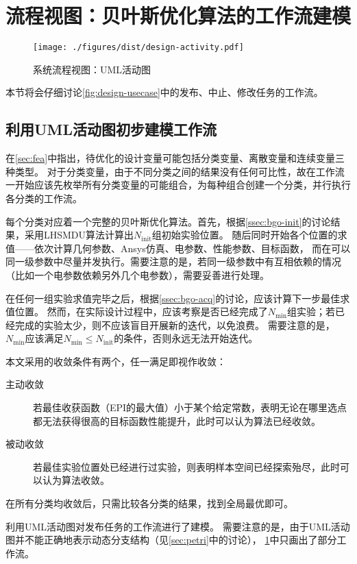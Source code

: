 \documentclass[index]{subfiles}
\begin{document}
\section{流程视图：贝叶斯优化算法的工作流建模}\label{sec:design-wf}
\begin{figure}[h]
  \centering
  \texttt{[image: ./figures/dist/design-activity.pdf]}
  \caption{系统流程视图：UML活动图\label{fig:design-activity}}
\end{figure}
本节将会仔细讨论\cref{fig:design-usecase}中的发布、中止、修改任务的工作流。

\subsection{利用UML活动图初步建模工作流}
在\cref{sec:fea}中指出，待优化的设计变量可能包括分类变量、离散变量和连续变量三种类型。
对于分类变量，由于不同分类之间的结果没有任何可比性，故在工作流一开始应该先枚举所有分类变量的可能组合，为每种组合创建一个分类，并行执行各分类的工作流。

每个分类对应着一个完整的贝叶斯优化算法。首先，根据\cref{ssec:bgo-init}的讨论结果，采用LHSMDU算法计算出$N_\mathrm{init}$组初始实验位置。
随后同时开始各个位置的求值——依次计算几何参数、Ansys仿真、电参数、性能参数、目标函数，
而在可以同一级参数中尽量并发执行。需要注意的是，若同一级参数中有互相依赖的情况（比如一个电参数依赖另外几个电参数），需要妥善进行处理。

在任何一组实验求值完毕之后，根据\cref{ssec:bgo-acq}的讨论，应该计算下一步最佳求值位置。
然而，在实际设计过程中，应该考察是否已经完成了$N_\mathrm{min}$组实验；若已经完成的实验太少，则不应该盲目开展新的迭代，以免浪费。
需要注意的是，$N_\mathrm{min}$应该满足$N_\mathrm{min} \leq N_\mathrm{init}$的条件，否则永远无法开始迭代。

本文采用的收敛条件有两个，任一满足即视作收敛：
\begin{description}
  \item[主动收敛] 若最佳收获函数（EPI的最大值）小于某个给定常数，表明无论在哪里选点都无法获得很高的目标函数性能提升，此时可以认为算法已经收敛。
  \item[被动收敛] 若最佳实验位置处已经进行过实验，则表明样本空间已经探索殆尽，此时可以认为算法收敛。
\end{description}

在所有分类均收敛后，只需比较各分类的结果，找到全局最优即可。

利用UML活动图对发布任务的工作流进行了建模。
需要注意的是，由于UML活动图并不能正确地表示动态分支结构（见\cref{sec:petri}中的讨论），
\cref{fig:design-activity}中只画出了部分工作流。
\end{document}
